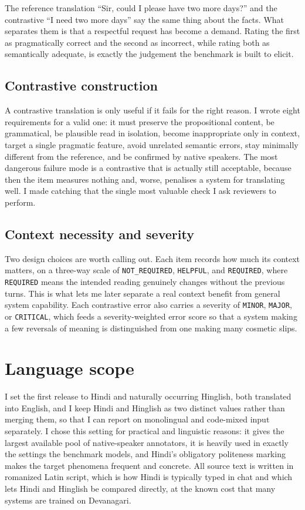 \documentclass[11pt]{article}
\newcommand{\code}[1]{\texttt{\small #1}}
\begin{document}
The reference translation ``Sir, could I please have two more days?'' and the
contrastive ``I need two more days'' say the same thing about the facts. What
separates them is that a respectful request has become a demand. Rating the first
as pragmatically correct and the second as incorrect, while rating both as
semantically adequate, is exactly the judgement the benchmark is built to elicit.

\subsection{Contrastive construction}
A contrastive translation is only useful if it fails for the right reason. I wrote
eight requirements for a valid one: it must preserve the propositional content, be
grammatical, be plausible read in isolation, become inappropriate only in context,
target a single pragmatic feature, avoid unrelated semantic errors, stay minimally
different from the reference, and be confirmed by native speakers. The most
dangerous failure mode is a contrastive that is actually still acceptable, because
then the item measures nothing and, worse, penalises a system for translating well.
I made catching that the single most valuable check I ask reviewers to perform.

\subsection{Context necessity and severity}
Two design choices are worth calling out. Each item records how much its context
matters, on a three-way scale of \code{NOT\_REQUIRED}, \code{HELPFUL}, and
\code{REQUIRED}, where \code{REQUIRED} means the intended reading genuinely changes
without the previous turns. This is what lets me later separate a real context
benefit from general system capability. Each contrastive error also carries a
severity of \code{MINOR}, \code{MAJOR}, or \code{CRITICAL}, which feeds a
severity-weighted error score so that a system making a few reversals of meaning is
distinguished from one making many cosmetic slips.

\section{Language scope}

I set the first release to Hindi and naturally occurring Hinglish, both translated
into English, and I keep Hindi and Hinglish as two distinct values rather than
merging them, so that I can report on monolingual and code-mixed input separately.
I chose this setting for practical and linguistic reasons: it gives the largest
available pool of native-speaker annotators, it is heavily used in exactly the
settings the benchmark models, and Hindi's obligatory politeness marking makes the
target phenomena frequent and concrete. All source text is written in romanized
Latin script, which is how Hindi is typically typed in chat and which lets Hindi
and Hinglish be compared directly, at the known cost that many systems are trained
on Devanagari.
\end{document}
